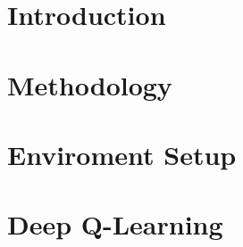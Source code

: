 \documentclass{report}
\begin{document}


\tableofcontents

\chapter{Introduction}\label{ch:intro}


\chapter{Methodology}\label{ch:methodology}


\chapter{Enviroment Setup}\label{ch:environment-setup}


\chapter{Deep Q-Learning}\label{ch:dqn}


\printnoidxglossaries{}



\end{document}
